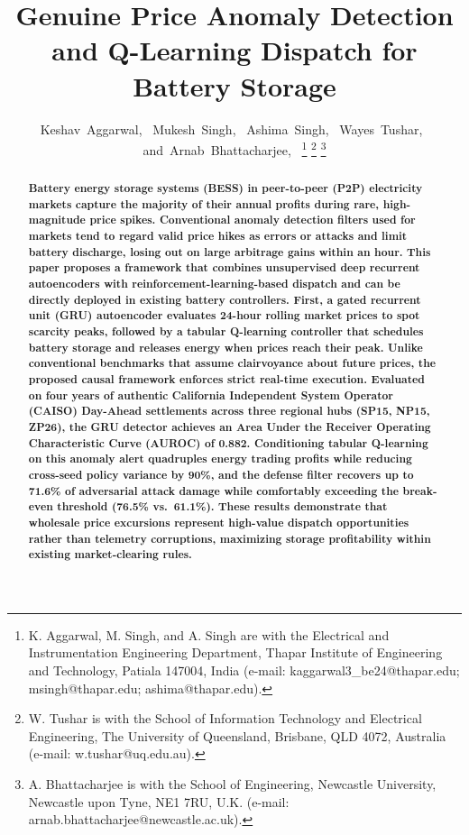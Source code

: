 \documentclass[journal]{IEEEtran}
\begin{document}
\title{Genuine Price Anomaly Detection and Q-Learning Dispatch for Battery Storage}

\author{Keshav~Aggarwal,~
Mukesh~Singh,~
Ashima~Singh,~
Wayes~Tushar,~
and~Arnab~Bhattacharjee,~%
\thanks{K. Aggarwal, M. Singh, and A. Singh are with the Electrical and Instrumentation Engineering Department, Thapar Institute of Engineering and Technology, Patiala 147004, India (e-mail: kaggarwal3\_be24@thapar.edu; msingh@thapar.edu; ashima@thapar.edu).}%
\thanks{W. Tushar is with the School of Information Technology and Electrical Engineering, The University of Queensland, Brisbane, QLD 4072, Australia (e-mail: w.tushar@uq.edu.au).}%
\thanks{A. Bhattacharjee is with the School of Engineering, Newcastle University, Newcastle upon Tyne, NE1 7RU, U.K. (e-mail: arnab.bhattacharjee@newcastle.ac.uk).}%
}

\maketitle

\begin{abstract}
\bfseries
Battery energy storage systems (BESS) in peer-to-peer (P2P) electricity markets capture the majority of their annual profits during rare, high-magnitude price spikes.
Conventional anomaly detection filters used for markets tend to regard valid price hikes as errors or attacks and limit battery discharge, losing out on large arbitrage gains within an hour.
This paper proposes a framework that combines unsupervised deep recurrent autoencoders with reinforcement-learning-based dispatch and can be directly deployed in existing battery controllers. 
First, a gated recurrent unit (GRU) autoencoder evaluates 24-hour rolling market prices to spot scarcity peaks, followed by a tabular Q-learning controller that schedules battery storage and releases energy when prices reach their peak.
Unlike conventional benchmarks that assume clairvoyance about future prices, the proposed causal framework enforces strict real-time execution. Evaluated on four years of authentic California Independent System Operator (CAISO) Day-Ahead settlements across three regional hubs (SP15, NP15, ZP26), the GRU detector achieves an Area Under the Receiver Operating Characteristic Curve (AUROC) of 0.882.
Conditioning tabular Q-learning on this anomaly alert quadruples energy trading profits while reducing cross-seed policy variance by 90\%, and the defense filter recovers up to 71.6\% of adversarial attack damage while comfortably exceeding the break-even threshold (76.5\% vs.\ 61.1\%).
These results demonstrate that wholesale price excursions represent high-value dispatch opportunities rather than telemetry corruptions, maximizing storage profitability within existing market-clearing rules.\end{abstract}
\end{document}
